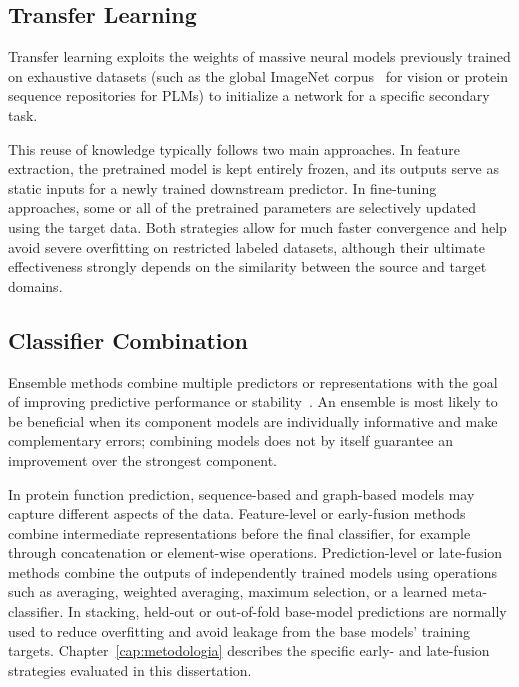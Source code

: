 \documentclass[Ingles]{ic-tese-v3}
\begin{document}
\subsection{Transfer Learning}

Transfer learning exploits the weights of massive neural models previously trained on exhaustive datasets (such as the global ImageNet corpus~\cite{russakovsky2015imagenet} for vision or protein sequence repositories for PLMs) to initialize a network for a specific secondary task. 

This reuse of knowledge typically follows two main approaches. In feature extraction, the pretrained model is kept entirely frozen, and its outputs serve as static inputs for a newly trained downstream predictor. In fine-tuning approaches, some or all of the pretrained parameters are selectively updated using the target data. Both strategies allow for much faster convergence and help avoid severe overfitting on restricted labeled datasets, although their ultimate effectiveness strongly depends on the similarity between the source and target domains.

\subsection{Classifier Combination}

Ensemble methods combine multiple predictors or representations with the goal of improving predictive performance or stability~\cite{dietterich2000ensemble}. An ensemble is most likely to be beneficial when its component models are individually informative and make complementary errors; combining models does not by itself guarantee an improvement over the strongest component.

In protein function prediction, sequence-based and graph-based models may capture different aspects of the data. Feature-level or early-fusion methods combine intermediate representations before the final classifier, for example through concatenation or element-wise operations. Prediction-level or late-fusion methods combine the outputs of independently trained models using operations such as averaging, weighted averaging, maximum selection, or a learned meta-classifier. In stacking, held-out or out-of-fold base-model predictions are normally used to reduce overfitting and avoid leakage from the base models' training targets. Chapter~\ref{cap:metodologia} describes the specific early- and late-fusion strategies evaluated in this dissertation.
\end{document}
